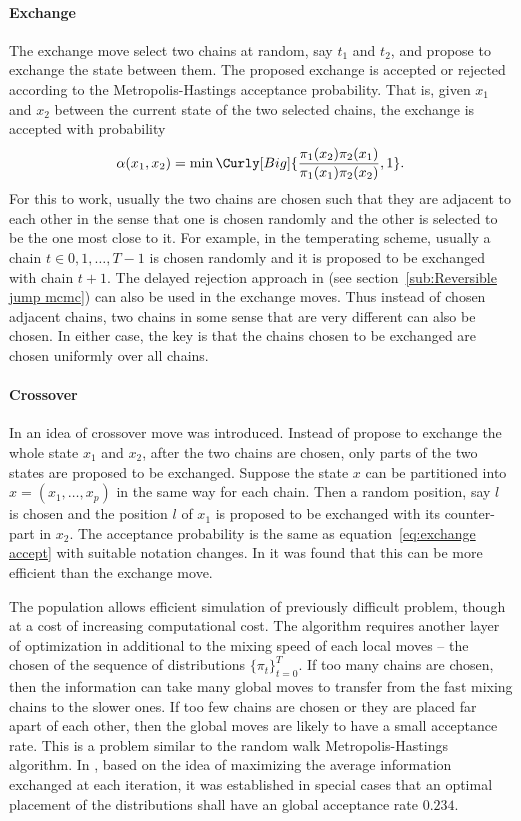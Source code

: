 \paragraph{Exchange} The exchange move select two chains at random, say $t_1$
and $t_2$, and propose to exchange the state between them. The proposed
exchange is accepted or rejected according to the Metropolis-Hastings
acceptance probability. That is, given $x_1$ and $x_2$ between the current
state of the two selected chains, the exchange is accepted with probability
\begin{equation}
  \alpha(x_1, x_2) =
  \min\Curly[Big]{\frac{\pi_1(x_2)\pi_2(x_1)}{\pi_1(x_1)\pi_2(x_2)}, 1}.
  \label{eq:exchange accept}
\end{equation}
For this to work, usually the two chains are chosen such that they are
adjacent to each other in the sense that one is chosen randomly and the other
is selected to be the one most close to it. For example, in the temperating
scheme, usually a chain $t\in{0,1,\dots,T-1}$ is chosen randomly and it is
proposed to be exchanged with chain $t+1$. The delayed rejection approach in
\cite{Green:2001tk} (see section~\ref{sub:Reversible jump mcmc}) can also be
used in the exchange moves. Thus instead of chosen adjacent chains, two chains
in some sense that are very different can also be chosen. In either case, the
key is that the chains chosen to be exchanged are chosen uniformly over all
chains.

\paragraph{Crossover} In \cite{Liang:2001dc} an idea of crossover move was
introduced. Instead of propose to exchange the whole state $x_1$ and $x_2$,
after the two chains are chosen, only parts of the two states are proposed to
be exchanged. Suppose the state $x$ can be partitioned into $x =
(x_1,\dots,x_p)$ in the same way for each chain. Then a random position, say
$l$ is chosen and the position $l$ of $x_1$ is proposed to be exchanged with
its counter-part in $x_2$. The acceptance probability is the same as
equation~\eqref{eq:exchange accept} with suitable notation changes. In
\cite{Jasra:2007in} it was found that this can be more efficient than the
exchange move.

The population \mcmc allows efficient simulation of previously difficult
problem, though at a cost of increasing computational cost. The algorithm
requires another layer of optimization in additional to the mixing speed of
each local moves -- the chosen of the sequence of distributions
$\{\pi_t\}_{t=0}^T$. If too many chains are chosen, then the information can
take many global moves to transfer from the fast mixing chains to the slower
ones. If too few chains are chosen or they are placed far apart of each other,
then the global moves are likely to have a small acceptance rate. This is a
problem similar to the random walk Metropolis-Hastings algorithm. In
\cite{Atchade:2010ha}, based on the idea of maximizing the average information
exchanged at each iteration, it was established in special cases that an
optimal placement of the distributions shall have an global acceptance rate
$0.234$.

